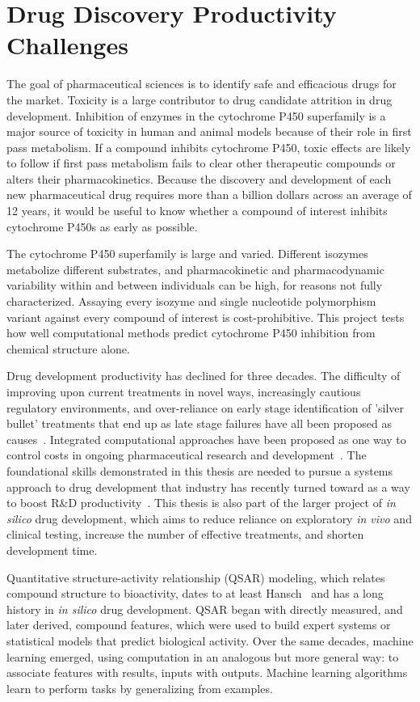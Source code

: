
\section{Drug Discovery Productivity Challenges}

The goal of pharmaceutical sciences is to identify safe and efficacious drugs for the market. Toxicity is a large contributor to drug candidate attrition in drug development. Inhibition of enzymes in the cytochrome P450 superfamily is a major source of toxicity in human and animal models because of their role in first pass metabolism. If a compound inhibits cytochrome P450, toxic effects are likely to follow if first pass metabolism fails to clear other therapeutic compounds or alters their pharmacokinetics. Because the discovery and development of each new pharmaceutical drug requires more than a billion dollars across an average of 12 years, it would be useful to know whether a compound of interest inhibits cytochrome P450s as early as possible.

The cytochrome P450 superfamily is large and varied. Different isozymes metabolize different substrates, and pharmacokinetic and pharmacodynamic variability within and between individuals can be high, for reasons not fully characterized. Assaying every isozyme and single nucleotide polymorphism variant against every compound of interest is cost-prohibitive. This project tests how well computational methods predict cytochrome P450 inhibition from chemical structure alone.

Drug development productivity has declined for three decades. The difficulty of improving upon current treatments in novel ways, increasingly cautious regulatory environments, and over-reliance on early stage identification of 'silver bullet' treatments that end up as late stage failures have all been proposed as causes~\cite{Scannell2012}. Integrated computational approaches have been proposed as one way to control costs in ongoing pharmaceutical research and development~\cite{Visser2014}. The foundational skills demonstrated in this thesis are needed to pursue a systems approach to drug development that industry has recently turned toward as a way to boost R\&D productivity~\cite{Berg2014}. This thesis is also part of the larger project of \textit{in silico} drug development, which aims to reduce reliance on exploratory \textit{in vivo} and clinical testing, increase the number of effective treatments, and shorten development time.

Quantitative structure-activity relationship (QSAR) modeling, which relates compound structure to bioactivity, dates to at least Hansch~\cite{Hansch1964} and has a long history in \textit{in silico} drug development. QSAR began with directly measured, and later derived, compound features, which were used to build expert systems or statistical models that predict biological activity. Over the same decades, machine learning emerged, using computation in an analogous but more general way: to associate features with results, inputs with outputs. Machine learning algorithms learn to perform tasks by generalizing from examples.

